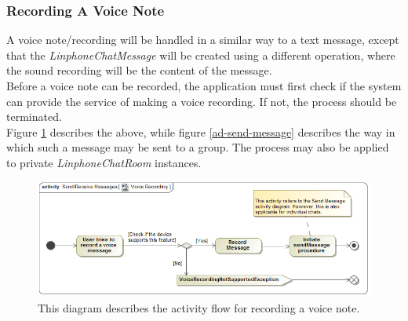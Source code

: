 \documentclass[11pt]{article}
\begin{document}
\subsubsection{Recording A Voice Note}
A voice note/recording will be handled in a similar way to a text message, except that the \textit{LinphoneChatMessage} will be created using a different operation, where the sound recording will be the content of the message.\\
Before a voice note can be recorded, the application must first check if the system can provide the service of making a voice recording. If not, the process should be terminated.\\
Figure \ref{ad-voice-record} describes the above, while figure \ref{ad-send-message} describes the way in which such a message may be sent to a group. The process may also be applied to private \textit{LinphoneChatRoom} instances.
\begin{figure}[H]
\centering
\includegraphics[width=5in]{./images/activity_voice_record.png}
\caption[Voice Recording Activity Diagram]{This diagram describes the activity flow for recording a voice note.}
\label{ad-voice-record}
\end{figure}
\end{document}
